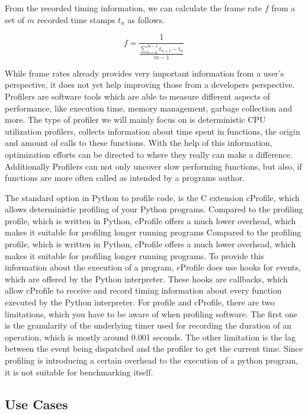 From the recorded timing information, we can calculate the frame rate $f$ from a
set of $m$ recorded time stamps $t_n$ as follows.
\cite{FrameRates}

$$f = \frac{1}{\frac{ \sum_{n=0}^{m-1} t_{n+1} - t_{n} }{ m - 1 }}$$

While frame rates already provides very important information from a user's
perspective, it does not yet help improving those from a developers perspective.
Profilers are software tools which are able to measure different aspects of
performance, like execution time, memory management, garbage collection and
more. The type of profiler we will mainly focus on is deterministic CPU
utilization profilers, collects information about time spent in functions, the
origin and amount of calls to these functions. With the help of this
information, optimization efforts can be directed to where they really can make
a difference. Additionally Profilers can not only uncover slow performing
functions, but also, if functions are more often called as intended by a programs
author.
\cite{CProfilerExample}

The standard option in Python to profile code, is the C extension cProfile,
which allows deterministic profiling of your Python programs. Compared to the
profiling profile, which is written in Python, cProfile offers a much lower
overhead, which makes it suitable for profiling longer running programs Compared
to the profiling profile, which is written in Python, cProfile offers a much
lower overhead, which makes it suitable for profiling longer running programs.
To provide this information about the execution of a program, cProfile does use
hooks for events, which are offered by the Python interpreter. These hooks are
callbacks, which allow cProfile to receive and record timing information about
every function executed by the Python interpreter. For profile and cProfile,
there are two limitations, which you have to be aware of when profiling
software.  The first one is the granularity of the underlying timer used for
recording the duration of an operation, which is mostly around 0.001 seconds.
The other limitation is the lag between the event being dispatched and the
profiler to get the current time. Since profiling is introducing a certain
overhead to the execution of a python program, it is not suitable for
benchmarking itself.
\cite{CProfiler}

\subsection{Use Cases}

